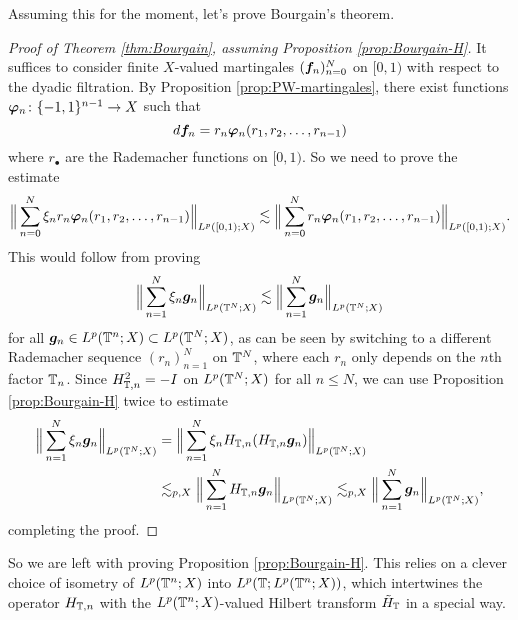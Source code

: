 Assuming this for the moment, let's prove Bourgain's theorem.
\begin{proof}[Proof of Theorem \ref{thm:Bourgain}, assuming Proposition \ref{prop:Bourgain-H}]
  It suffices to consider finite $X$-valued martingales $(\bm{f}_n)_{n=0}^{N}$ on $[0,1)$ with respect to the dyadic filtration.
  By Proposition \ref{prop:PW-martingales}, there exist functions $\bm{\varphi}_{n} \colon \{-1,1\}^{n-1} \rightarrow X$ such that
  \begin{equation*}
    d\bm{f}_{n} = r_{n} \bm{\varphi}_{n}(r_{1}, r_{2}, \ldots, r_{n-1})
  \end{equation*}
  where $r_{\bullet}$ are the Rademacher functions on $[0,1)$.
  So we need to prove the estimate
  \begin{equation*}
    \Big\| \sum_{n=0}^{N} \xi_{n} r_{n} \bm{\varphi}_{n}(r_{1}, r_{2}, \ldots, r_{n-1}) \Big\|_{L^p([0,1);X)} \lesssim \Big\| \sum_{n=0}^{N} r_{n} \bm{\varphi}_{n}(r_{1}, r_{2}, \ldots, r_{n-1}) \Big\|_{L^p([0,1);X)}.
  \end{equation*}
  This would follow from proving
  \begin{equation*}
    \Big\| \sum_{n=1}^{N} \xi_{n} \bm{g}_{n} \Big\|_{L^p(\mathbb{T}^{N};X)} \lesssim \Big\| \sum_{n=1}^{N} \bm{g}_{n} \Big\|_{L^p(\mathbb{T}^{N};X)}
  \end{equation*}
  for all $\bm{g}_{n} \in L^p(\mathbb{T}^{n};X) \subset L^p(\mathbb{T}^{N};X)$, as can be seen by switching to a different Rademacher sequence $(r_{n})_{n=1}^{N}$ on $\mathbb{T}^{N}$, where each $r_{n}$ only depends on the $n$th factor $\mathbb{T}_{n}$.
  Since $H_{\mathbb{T},n}^{2} = -I$ on $L^p(\mathbb{T}^{N};X)$ for all $n \leq N$, we can use Proposition \ref{prop:Bourgain-H} twice to estimate
  \begin{equation*}
    \begin{aligned}
      \Big\| \sum_{n=1}^{N} \xi_{n} \bm{g}_{n} \Big\|_{L^p(\mathbb{T}^{N};X)}
      &= \Big\| \sum_{n=1}^{N} \xi_{n} H_{\mathbb{T},n} (H_{\mathbb{T},n} \bm{g}_{n}) \Big\|_{L^p(\mathbb{T}^{N};X)} \\
      &\lesssim_{p,X}  \Big\| \sum_{n=1}^{N} H_{\mathbb{T},n} \bm{g}_{n} \Big\|_{L^p(\mathbb{T}^{N};X)} 
      \lesssim_{p,X}  \Big\| \sum_{n=1}^{N} \bm{g}_{n} \Big\|_{L^p(\mathbb{T}^{N};X)},
    \end{aligned}
  \end{equation*}
  completing the proof.
\end{proof}

So we are left with proving Proposition \ref{prop:Bourgain-H}.
This relies on a clever choice of isometry of $L^p(\mathbb{T}^{n};X)$ into $L^p(\mathbb{T}; L^p(\mathbb{T}^{n};X))$, which intertwines the operator $H_{\mathbb{T},n}$ with the $L^p(\mathbb{T}^{n};X)$-valued Hilbert transform $\tilde{H}_{\mathbb{T}}$ in a special way.

